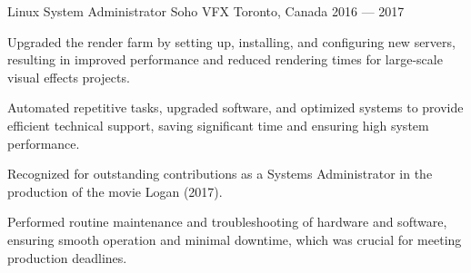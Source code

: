 \begin{cventries}
\cventry%
  {Linux System Administrator}
  {Soho VFX}
  {Toronto, Canada}
  {2016 --- 2017}
  {
    \begin{cvitems}
      \item Upgraded the render farm by setting up, installing, and configuring new servers, resulting in improved performance and reduced rendering times for large-scale visual effects projects.
      \item Automated repetitive tasks, upgraded software, and optimized systems to provide efficient technical support, saving significant time and ensuring high system performance.
      \item Recognized for outstanding contributions as a Systems Administrator in the production of the movie Logan (2017).
      \item Performed routine maintenance and troubleshooting of hardware and software, ensuring smooth operation and minimal downtime, which was crucial for meeting production deadlines.
    \end{cvitems}
  }
\end{cventries}
